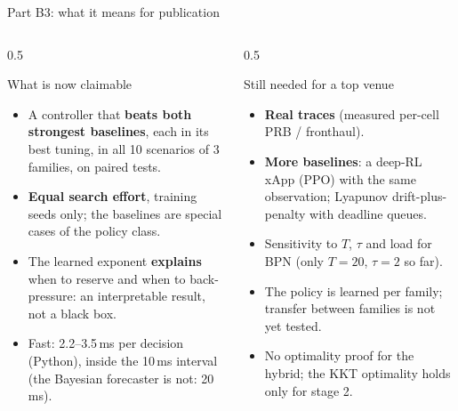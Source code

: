 \documentclass[aspectratio=169,11pt,xcolor=table]{beamer}
\begin{document}
\begin{frame}{Part B3: what it means for publication}
  \small
  \begin{columns}[T]
    \begin{column}{0.5\textwidth}
      \begin{exampleblock}{What is now claimable}
        \begin{itemize}\footnotesize
          \item A controller that \textbf{beats both strongest baselines}, each in its best tuning, in all 10 scenarios of 3 families, on paired tests.
          \item \textbf{Equal search effort}, training seeds only; the baselines are special cases of the policy class.
          \item The learned exponent \textbf{explains} when to reserve and when to back-pressure: an interpretable result, not a black box.
          \item Fast: 2.2--3.5\,ms per decision (Python), inside the 10\,ms interval (the Bayesian forecaster is not: 20\,ms).
        \end{itemize}
      \end{exampleblock}
    \end{column}
    \begin{column}{0.5\textwidth}
      \begin{alertblock}{Still needed for a top venue}
        \begin{itemize}\footnotesize
          \item \textbf{Real traces} (measured per-cell PRB / fronthaul).
          \item \textbf{More baselines}: a deep-RL xApp (PPO) with the same observation; Lyapunov drift-plus-penalty with deadline queues.
          \item Sensitivity to $T$, $\tau$ and load for BPN (only $T = 20$, $\tau = 2$ so far).
          \item The policy is learned per family; transfer between families is not yet tested.
          \item No optimality proof for the hybrid; the KKT optimality holds only for stage 2.
        \end{itemize}
      \end{alertblock}
    \end{column}
  \end{columns}
\end{frame}

\end{document}
